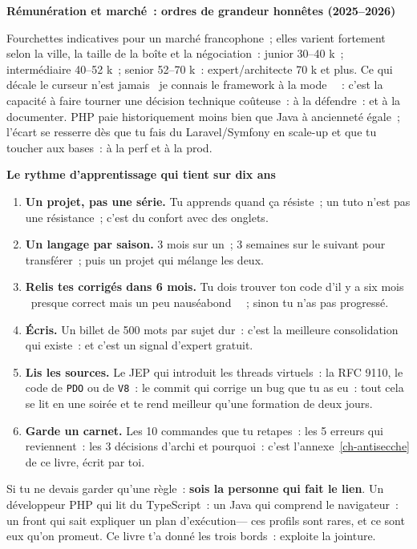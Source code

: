 \documentclass[12pt,a4paper,twoside,openright]{book}
\newcommand{\etape}[1]{\par\medskip\noindent\textbf{\large #1}\par\smallskip}
\begin{document}
\etape{R\'emun\'eration et march\'e~: ordres de grandeur honn\^etes (2025--2026)}
Fourchettes indicatives pour un march\'e francophone~; elles varient fortement selon la ville, la
taille de la bo\^ite et la n\'egociation~: junior 30--40 k\texteuro{}~; interm\'ediaire 40--52 k\texteuro{}~;
senior 52--70 k\texteuro{}~: expert/architecte 70 k\texteuro{} et plus. Ce qui d\'ecale le curseur n'est
jamais \og ~je connais le framework \`a la mode~ \fg{}~: c'est la capacit\'e \`a faire tourner une d\'ecision
technique co\^uteuse~: \`a la d\'efendre~: et \`a la documenter. PHP paie historiquement moins bien que Java
\`a anciennet\'e \'egale~; l'\'ecart se resserre d\`es que tu fais du Laravel/Symfony en scale-up et que tu
toucher aux bases~: \`a la perf et \`a la prod.

\etape{Le rythme d'apprentissage qui tient sur dix ans}
\begin{enumerate}
  \item \textbf{Un projet, pas une s\'erie.} Tu apprends quand \c{c}a r\'esiste~; un tuto n'est pas une
        r\'esistance~; c'est du confort avec des onglets.
  \item \textbf{Un langage par saison.} 3 mois sur un~; 3 semaines sur le suivant pour transf\'erer~;
        puis un projet qui m\'elange les deux.
  \item \textbf{Relis tes corrig\'es dans 6 mois.} Tu dois trouver ton code d'il y a six mois
        \og ~presque correct mais un peu naus\'eabond~ \fg{}~; sinon tu n'as pas progress\'e.
  \item \textbf{\'Ecris.} Un billet de 500 mots par sujet dur~: c'est la meilleure consolidation
        qui existe~: et c'est un signal d'expert gratuit.
  \item \textbf{Lis les sources.} Le JEP qui introduit les threads virtuels~: la RFC 9110, le code
        de \verb|PDO| ou de \verb|V8|~: le commit qui corrige un bug que tu as eu~: tout cela se lit
        en une soir\'ee et te rend meilleur qu'une formation de deux jours.
  \item \textbf{Garde un carnet.} Les 10 commandes que tu retapes~: les 5 erreurs qui reviennent~:
        les 3 d\'ecisions d'archi et pourquoi~: c'est l'annexe~\ref{ch-antisecche} de ce livre, \'ecrit par toi.
\end{enumerate}

\begin{astuce}
Si tu ne devais garder qu'une r\`egle~: \textbf{sois la personne qui fait le lien}. Un d\'eveloppeur PHP
qui lit du TypeScript~: un Java qui comprend le navigateur~: un front qui sait expliquer un plan
d'ex\'ecution--- ces profils sont rares, et ce sont eux qu'on promeut. Ce livre t'a donn\'e les trois
bords~: exploite la jointure.
\end{astuce}
\end{document}
